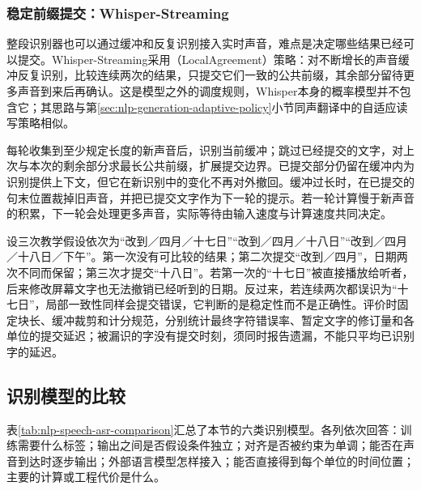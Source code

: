 \subsubsection{稳定前缀提交：Whisper-Streaming}
\label{sec:nlp-speech-whisper-streaming}

整段识别器也可以通过缓冲和反复识别接入实时声音，难点是决定哪些结果已经可以提交。Whisper-Streaming采用（LocalAgreement）策略：对不断增长的声音缓冲反复识别，比较连续两次的结果，只提交它们一致的公共前缀，其余部分留待更多声音到来后再确认。这是模型之外的调度规则，Whisper本身的概率模型并不包含它；其思路与第\ref{sec:nlp-generation-adaptive-policy}小节同声翻译中的自适应读写策略相似。

每轮收集到至少规定长度的新声音后，识别当前缓冲；跳过已经提交的文字，对上次与本次的剩余部分求最长公共前缀，扩展提交边界。已提交部分仍留在缓冲内为识别提供上下文，但它在新识别中的变化不再对外撤回。缓冲过长时，在已提交的句末位置裁掉旧声音，并把已提交文字作为下一轮的提示。若一轮计算慢于新声音的积累，下一轮会处理更多声音，实际等待由输入速度与计算速度共同决定。

设三次教学假设依次为“改到／四月／十七日”“改到／四月／十八日”“改到／四月／十八日／下午”。第一次没有可比较的结果；第二次提交“改到／四月”，日期两次不同而保留；第三次才提交“十八日”。若第一次的“十七日”被直接播放给听者，后来修改屏幕文字也无法撤销已经听到的日期。反过来，若连续两次都误识为“十七日”，局部一致性同样会提交错误，它判断的是稳定性而不是正确性。评价时固定块长、缓冲裁剪和计分规范，分别统计最终字符错误率、暂定文字的修订量和各单位的提交延迟；被漏识的字没有提交时刻，须同时报告遗漏，不能只平均已识别字的延迟。

\subsection{识别模型的比较}
\label{sec:nlp-speech-asr-comparison}

表\ref{tab:nlp-speech-asr-comparison}汇总了本节的六类识别模型。各列依次回答：训练需要什么标签；输出之间是否假设条件独立；对齐是否被约束为单调；能否在声音到达时逐步输出；外部语言模型怎样接入；能否直接得到每个单位的时间位置；主要的计算或工程代价是什么。

